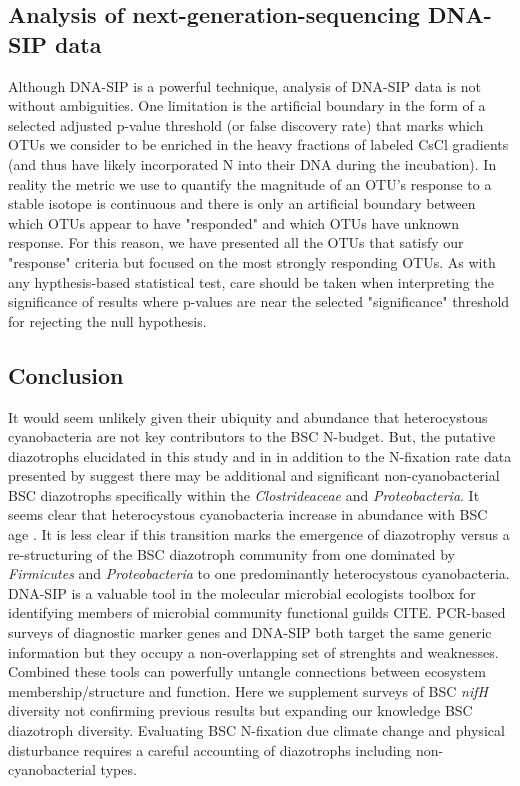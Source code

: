 \subsection{Analysis of next-generation-sequencing DNA-SIP data}
Although DNA-SIP is a powerful technique, analysis of DNA-SIP data is not without ambiguities. One limitation is the artificial boundary in the form of a selected adjusted p-value threshold (or false discovery rate) that marks which OTUs we consider to be enriched in the heavy fractions of labeled CsCl gradients (and thus have likely incorporated N into their DNA during the incubation). In reality the metric we use to quantify the magnitude of an OTU's response to a stable isotope is continuous and there is only an artificial boundary between which OTUs appear to have "responded" and which OTUs have unknown response. For this reason, we have presented all the OTUs that satisfy our "response" criteria but focused on the most strongly responding OTUs. As with any hypthesis-based statistical test, care should be taken when interpreting the significance of results where p-values are near the selected "significance" threshold for rejecting the null hypothesis.

\subsection{Conclusion}
It would seem unlikely given their ubiquity and abundance that heterocystous cyanobacteria are not key contributors to the BSC N-budget. But, the putative diazotrophs elucidated in this study and in \citet{Steppe_1996} in addition to the N-fixation rate data presented by \cite{15643930} suggest there may be additional and significant non-cyanobacterial BSC diazotrophs specifically within the \textit{Clostrideaceae} and \textit{Proteobacteria}. It seems clear that heterocystous cyanobacteria increase in abundance with BSC age \cite{14766579}. It is less clear if this transition marks the emergence of diazotrophy versus a re-structuring of the BSC diazotroph community from one dominated by \textit{Firmicutes} and \textit{Proteobacteria} to one predominantly heterocystous cyanobacteria. DNA-SIP is a valuable tool in the molecular microbial ecologists toolbox for identifying members of microbial community functional guilds CITE. PCR-based surveys of diagnostic marker genes and DNA-SIP both target the same generic information but they occupy a non-overlapping set of strenghts and weaknesses. Combined these tools can powerfully untangle connections between ecosystem membership/structure and function. Here we supplement surveys of BSC \textit{nifH} diversity not confirming previous results but expanding our knowledge BSC diazotroph diversity. Evaluating BSC N-fixation due climate change and physical disturbance requires a careful accounting of diazotrophs including non-cyanobacterial types. 

